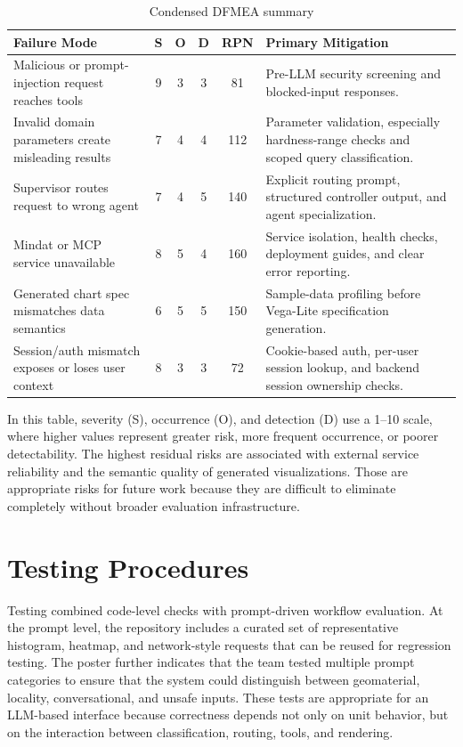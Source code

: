 \documentclass[12pt,oneside]{report}
\begin{document}
\begin{table}[H]
\centering
\caption{Condensed DFMEA summary}
\label{tab:dfmea}
\begin{tabularx}{\textwidth}{>{\raggedright\arraybackslash}p{2.15in} c c c c X}
\toprule
\textbf{Failure Mode} & \textbf{S} & \textbf{O} & \textbf{D} & \textbf{RPN} & \textbf{Primary Mitigation} \\
\midrule
Malicious or prompt-injection request reaches tools & 9 & 3 & 3 & 81 & Pre-LLM security screening and blocked-input responses. \\
Invalid domain parameters create misleading results & 7 & 4 & 4 & 112 & Parameter validation, especially hardness-range checks and scoped query classification. \\
Supervisor routes request to wrong agent & 7 & 4 & 5 & 140 & Explicit routing prompt, structured controller output, and agent specialization. \\
Mindat or MCP service unavailable & 8 & 5 & 4 & 160 & Service isolation, health checks, deployment guides, and clear error reporting. \\
Generated chart spec mismatches data semantics & 6 & 5 & 5 & 150 & Sample-data profiling before Vega-Lite specification generation. \\
Session/auth mismatch exposes or loses user context & 8 & 3 & 3 & 72 & Cookie-based auth, per-user session lookup, and backend session ownership checks. \\
\bottomrule
\end{tabularx}
\end{table}

\noindent In this table, severity (S), occurrence (O), and detection (D) use a 1--10 scale, where higher values represent greater risk, more frequent occurrence, or poorer detectability. The highest residual risks are associated with external service reliability and the semantic quality of generated visualizations. Those are appropriate risks for future work because they are difficult to eliminate completely without broader evaluation infrastructure.

\section{Testing Procedures}

Testing combined code-level checks with prompt-driven workflow evaluation. At the prompt level, the repository includes a curated set of representative histogram, heatmap, and network-style requests that can be reused for regression testing. The poster further indicates that the team tested multiple prompt categories to ensure that the system could distinguish between geomaterial, locality, conversational, and unsafe inputs. These tests are appropriate for an LLM-based interface because correctness depends not only on unit behavior, but on the interaction between classification, routing, tools, and rendering.
\end{document}
